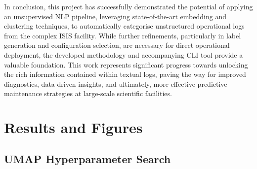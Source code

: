\documentclass[10pt,oneside]{report}
\renewcommand{\small}{\fontsize{7}{8}\selectfont}
\begin{document}
\noindent In conclusion, this project has successfully demonstrated the potential of applying an unsupervised NLP pipeline, leveraging state-of-the-art embedding and clustering techniques, to automatically categorise unstructured operational logs from the complex ISIS facility. While further refinements, particularly in label generation and configuration selection, are necessary for direct operational deployment, the developed methodology and accompanying CLI tool provide a valuable foundation. This work represents significant progress towards unlocking the rich information contained within textual logs, paving the way for improved diagnostics, data-driven insights, and ultimately, more effective predictive maintenance strategies at large-scale scientific facilities.




% 
\clearpage
\begin{multicols}{2} 
\small

\end{multicols}


\appendix

\chapter{Results and Figures}
\section{UMAP Hyperparameter Search} \label{app:umaphypgrid}
\end{document}
